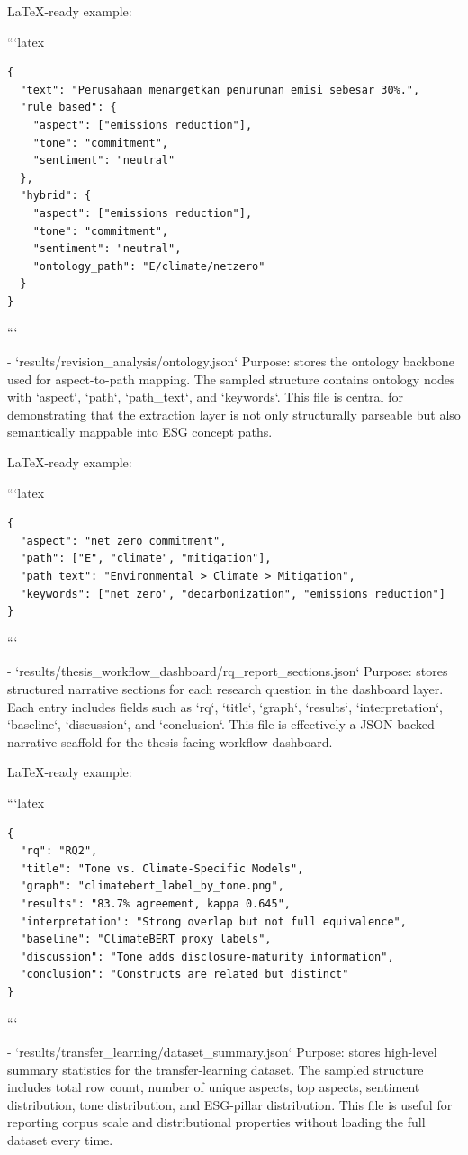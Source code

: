   LaTeX-ready example:

```latex
\begin{verbatim}
{
  "text": "Perusahaan menargetkan penurunan emisi sebesar 30%.",
  "rule_based": {
    "aspect": ["emissions reduction"],
    "tone": "commitment",
    "sentiment": "neutral"
  },
  "hybrid": {
    "aspect": ["emissions reduction"],
    "tone": "commitment",
    "sentiment": "neutral",
    "ontology_path": "E/climate/netzero"
  }
}
\end{verbatim}
```

- `results/revision_analysis/ontology.json`
  Purpose:
  stores the ontology backbone used for aspect-to-path mapping.
  The sampled structure contains ontology nodes with `aspect`, `path`, `path_text`, and `keywords`. This file is central for demonstrating that the extraction layer is not only structurally parseable but also semantically mappable into ESG concept paths.

  LaTeX-ready example:

```latex
\begin{verbatim}
{
  "aspect": "net zero commitment",
  "path": ["E", "climate", "mitigation"],
  "path_text": "Environmental > Climate > Mitigation",
  "keywords": ["net zero", "decarbonization", "emissions reduction"]
}
\end{verbatim}
```

- `results/thesis_workflow_dashboard/rq_report_sections.json`
  Purpose:
  stores structured narrative sections for each research question in the dashboard layer.
  Each entry includes fields such as `rq`, `title`, `graph`, `results`, `interpretation`, `baseline`, `discussion`, and `conclusion`. This file is effectively a JSON-backed narrative scaffold for the thesis-facing workflow dashboard.

  LaTeX-ready example:

```latex
\begin{verbatim}
{
  "rq": "RQ2",
  "title": "Tone vs. Climate-Specific Models",
  "graph": "climatebert_label_by_tone.png",
  "results": "83.7% agreement, kappa 0.645",
  "interpretation": "Strong overlap but not full equivalence",
  "baseline": "ClimateBERT proxy labels",
  "discussion": "Tone adds disclosure-maturity information",
  "conclusion": "Constructs are related but distinct"
}
\end{verbatim}
```

- `results/transfer_learning/dataset_summary.json`
  Purpose:
  stores high-level summary statistics for the transfer-learning dataset.
  The sampled structure includes total row count, number of unique aspects, top aspects, sentiment distribution, tone distribution, and ESG-pillar distribution. This file is useful for reporting corpus scale and distributional properties without loading the full dataset every time.


